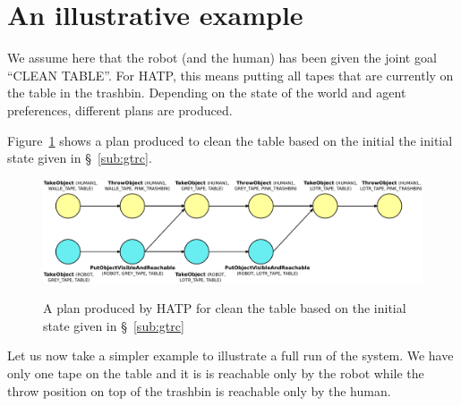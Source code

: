 \documentclass{svmult}
\begin{document}

\section{An illustrative example}\label{sec:expes}

We assume here that the robot (and the human) has been given the joint goal
``CLEAN TABLE''. For HATP, this means putting all tapes that are
currently on the table in the trashbin. Depending on the state of the
world and agent preferences, different plans are produced.

Figure~\ref{plan-etat2} shows a plan produced to clean the table based on the initial the initial state given in  \S~\ref{sub:gtrc}.

\begin{figure}[thpb]
  \centering
  \includegraphics[width=1.0\textwidth]{./figs/plan3.pdf} \\
  \caption {A plan produced by HATP for clean the table based on the initial state given in \S~\ref{sub:gtrc}}
  \label{plan-etat2}
\end{figure}

Let us now take a simpler example to illustrate a full run of the
system. We have only one tape on the table and it is is reachable only
by the robot while the throw position on top of the trashbin is
reachable only by the human.

\end{document}
